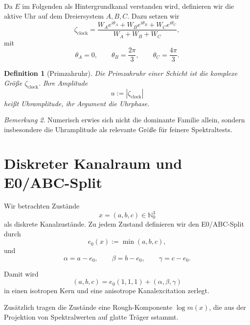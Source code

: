 \documentclass[11pt,a4paper]{article}
\newtheorem{definition}{Definition}[section]
\theoremstyle{remark}
\newtheorem{bemerkung}[definition]{Bemerkung}
\newcommand{\N}{\mathbb{N}}
\begin{document}
	Da $E$ im Folgenden als Hintergrundkanal verstanden wird, definieren wir die aktive Uhr auf dem Dreiersystem $A,B,C$. Dazu setzen wir
	\begin{equation}
		\zeta_{\mathrm{clock}} = \frac{W_A e^{i\theta_A}+W_B e^{i\theta_B}+W_C e^{i\theta_C}}{W_A+W_B+W_C},
	\end{equation}
	mit
	\begin{equation}
		\theta_A=0,
		\qquad
		\theta_B=\frac{2\pi}{3},
		\qquad
		\theta_C=\frac{4\pi}{3}.
	\end{equation}
	
	\begin{definition}[Primzahruhr]
		Die \emph{Primzahruhr} einer Schicht ist die komplexe Größe $\zeta_{\mathrm{clock}}$. Ihre Amplitude
		\begin{equation}
			u := |\zeta_{\mathrm{clock}}|
		\end{equation}
		heißt Uhramplitude, ihr Argument die Uhrphase.
	\end{definition}
	
	\begin{bemerkung}
		Numerisch erwies sich nicht die dominante Familie allein, sondern insbesondere die Uhramplitude als relevante Größe für feinere Spektraltests.
	\end{bemerkung}
	
	\section{Diskreter Kanalraum und E0/ABC-Split}
	
	Wir betrachten Zustände
	\begin{equation}
		x=(a,b,c)\in\N_0^3
	\end{equation}
	als diskrete Kanalzustände. Zu jedem Zustand definieren wir den E0/ABC-Split durch
	\begin{equation}
		e_0(x):=\min(a,b,c),
	\end{equation}
	und
	\begin{equation}
		\alpha=a-e_0,
		\qquad
		\beta=b-e_0,
		\qquad
		\gamma=c-e_0.
	\end{equation}
	
	Damit wird
	\begin{equation}
		(a,b,c)=e_0(1,1,1)+(\alpha,\beta,\gamma)
	\end{equation}
	in einen isotropen Kern und eine anisotrope Kanalexcitation zerlegt.
	
	Zusätzlich tragen die Zustände eine Rough-Komponente $\log m(x)$, die aus der Projektion von Spektralwerten auf glatte Träger sstammt.
	
\end{document}

